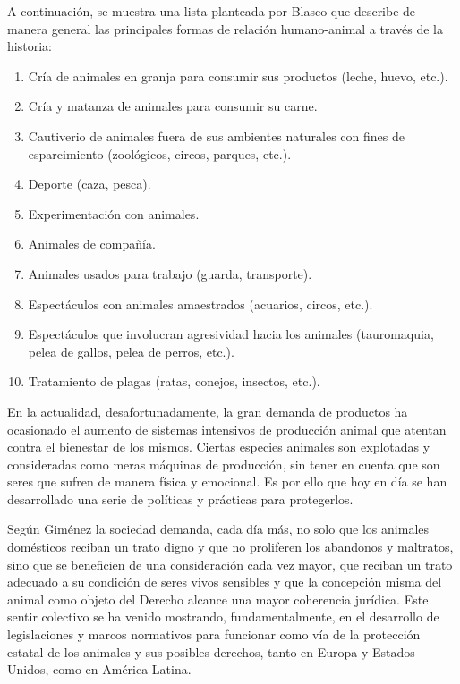 A continuación, se muestra una lista planteada por Blasco  que describe de manera general las principales formas de relación humano-animal a través de la historia:
\begin{enumerate}
\item Cría de animales en granja para consumir sus productos (leche, huevo, etc.).
\item  Cría y matanza de animales para consumir su carne.
\item  Cautiverio de animales fuera de sus ambientes naturales con fines de esparcimiento (zoológicos, circos, parques, etc.).
\item  Deporte (caza, pesca).
\item  Experimentación con animales.
\item  Animales de compañía.
\item  Animales usados para trabajo (guarda, transporte).
\item  Espectáculos con animales amaestrados (acuarios, circos, etc.).
\item  Espectáculos que involucran agresividad hacia los animales (tauromaquia, pelea de gallos, pelea de perros, etc.).
\item  Tratamiento de plagas (ratas, conejos, insectos, etc.).
\end{enumerate}
En la actualidad, desafortunadamente, la gran demanda de productos ha ocasionado el aumento de sistemas intensivos de producción animal que atentan contra el bienestar de los mismos. Ciertas especies animales son explotadas y consideradas como meras máquinas de producción, sin tener en cuenta que son seres que sufren de manera física y emocional. Es por ello que hoy en día se han desarrollado una serie de políticas y prácticas para protegerlos. 

Según Giménez  la sociedad demanda, cada día más, no solo que los animales domésticos reciban un trato digno y que no proliferen los abandonos y maltratos, sino que se beneficien de una consideración cada vez mayor, que reciban un trato adecuado a su condición de seres vivos sensibles y que la concepción misma del animal como objeto del Derecho alcance una mayor coherencia jurídica. Este sentir colectivo se ha venido mostrando, fundamentalmente, en el desarrollo de legislaciones y marcos normativos para funcionar como vía de la protección estatal de los animales y sus posibles derechos, tanto en Europa y Estados Unidos, como en América Latina.  

